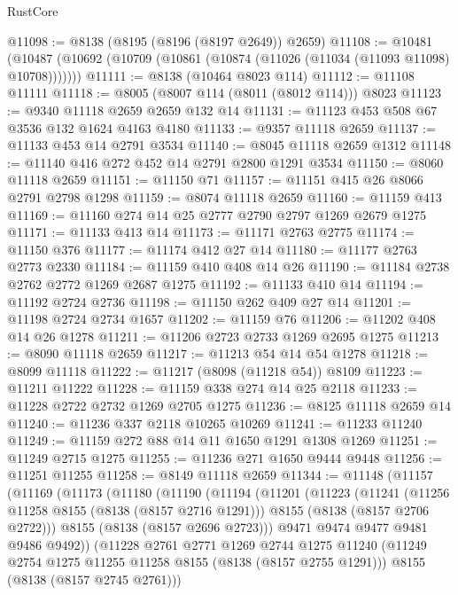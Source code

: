 \begin{lexlean}{RustCore}
\begin{coremodule}
@11098 := @8138 (@8195 (@8196 (@8197 @2649)) @2659)
@11108 := @10481
    (@10487 (@10692 (@10709 (@10861 (@10874 (@11026 (@11034 (@11093 @11098) @10708)))))))
@11111 := @8138 (@10464 @8023 @114)
@11112 := @11108 @11111
@11118 := @8005 (@8007 @114 (@8011 (@8012 @114))) @8023
@11123 := @9340 @11118 @2659 @2659 @132 @14
@11131 := @11123 @453 @508 @67 @3536 @132 @1624 @4163 @4180
@11133 := @9357 @11118 @2659
@11137 := @11133 @453 @14 @2791 @3534
@11140 := @8045 @11118 @2659 @1312
@11148 := @11140 @416 @272 @452 @14 @2791 @2800 @1291 @3534
@11150 := @8060 @11118 @2659
@11151 := @11150 @71
@11157 := @11151 @415 @26 @8066 @2791 @2798 @1298
@11159 := @8074 @11118 @2659
@11160 := @11159 @413
@11169 := @11160 @274 @14 @25 @2777 @2790 @2797 @1269 @2679 @1275
@11171 := @11133 @413 @14
@11173 := @11171 @2763 @2775
@11174 := @11150 @376
@11177 := @11174 @412 @27 @14
@11180 := @11177 @2763 @2773 @2330
@11184 := @11159 @410 @408 @14 @26
@11190 := @11184 @2738 @2762 @2772 @1269 @2687 @1275
@11192 := @11133 @410 @14
@11194 := @11192 @2724 @2736
@11198 := @11150 @262 @409 @27 @14
@11201 := @11198 @2724 @2734 @1657
@11202 := @11159 @76
@11206 := @11202 @408 @14 @26 @1278
@11211 := @11206 @2723 @2733 @1269 @2695 @1275
@11213 := @8090 @11118 @2659
@11217 := @11213 @54 @14 @54 @1278
@11218 := @8099 @11118
@11222 := @11217 (@8098 (@11218 @54)) @8109
@11223 := @11211 @11222
@11228 := @11159 @338 @274 @14 @25 @2118
@11233 := @11228 @2722 @2732 @1269 @2705 @1275
@11236 := @8125 @11118 @2659 @14
@11240 := @11236 @337 @2118 @10265 @10269
@11241 := @11233 @11240
@11249 := @11159 @272 @88 @14 @11 @1650 @1291 @1308 @1269
@11251 := @11249 @2715 @1275
@11255 := @11236 @271 @1650 @9444 @9448
@11256 := @11251 @11255
@11258 := @8149 @11118 @2659
@11344 := @11148
    (@11157
      (@11169
        (@11173
          (@11180
            (@11190
              (@11194
                (@11201
                  (@11223
                    (@11241
                      (@11256 @11258 @8155 (@8138 (@8157 @2716 @1291)))
                      @8155
                      (@8138 (@8157 @2706 @2722)))
                    @8155
                    (@8138 (@8157 @2696 @2723)))
                  @9471
                  @9474
                  @9477
                  @9481
                  @9486
                  @9492))
              (@11228
                @2761
                @2771
                @1269
                @2744
                @1275
                @11240
                (@11249 @2754 @1275 @11255 @11258 @8155 (@8138 (@8157 @2755 @1291)))
                @8155
                (@8138 (@8157 @2745 @2761)))

\end{coremodule}
\end{lexlean}
